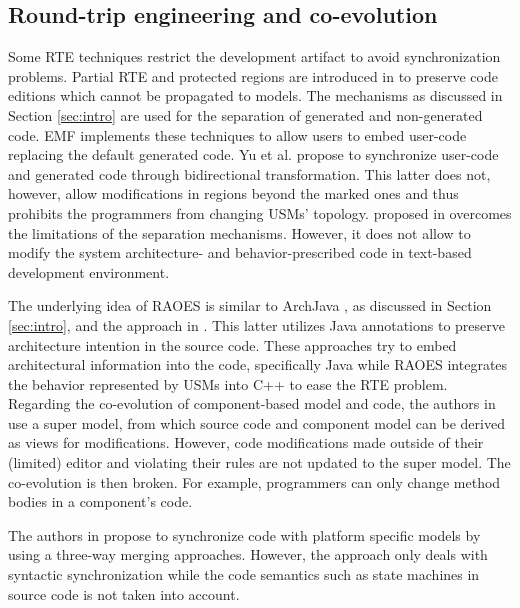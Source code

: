 \subsection{Round-trip engineering and co-evolution}
Some RTE techniques restrict the development artifact to avoid
synchronization problems.
Partial RTE and protected regions are introduced in \cite{czarnecki_multi-level_2006} to preserve code editions which cannot be propagated to models.
The mechanisms as discussed in Section \ref{sec:intro} are used for the separation of generated and non-generated code. 
EMF implements these techniques to allow users to embed user-code replacing the default generated code.
Yu et al. \cite{yu2012maintaining} propose to synchronize user-code and generated code through bidirectional transformation.
This latter does not, however, allow modifications in regions beyond the marked ones and thus prohibits the programmers from changing USMs' topology.
 proposed in \cite{zheng2012enhancing} overcomes the limitations of the separation mechanisms.
However, %
it does not allow to modify the system architecture- and behavior-prescribed code in text-based development environment.  


The underlying idea of RAOES is similar to ArchJava \cite{aldrich2002archjava}, \cite{ubayashi2010archface} as discussed in Section \ref{sec:intro}, and the approach in \cite{christensen2011towards}.
This latter utilizes Java annotations to preserve architecture intention in the source code.
These approaches try to embed architectural information into the code, specifically Java while RAOES integrates the behavior represented by USMs into C++ to ease the RTE problem. 
Regarding the co-evolution of component-based model and code, the authors in \cite{langhammer2013co, kramer2015change} use a super model, from which source code and component model can be derived as views for modifications.
However, code modifications made outside of their (limited) editor and violating their rules are not updated to the super model. The co-evolution is then broken. For example, programmers can only change method bodies in a component's code. 

The authors in \cite{angyal_synchronizing_2008} propose to synchronize code with platform specific models by using a three-way merging approaches.
However, the approach only deals with syntactic synchronization while the code semantics such as state machines in source code is not taken into account.

